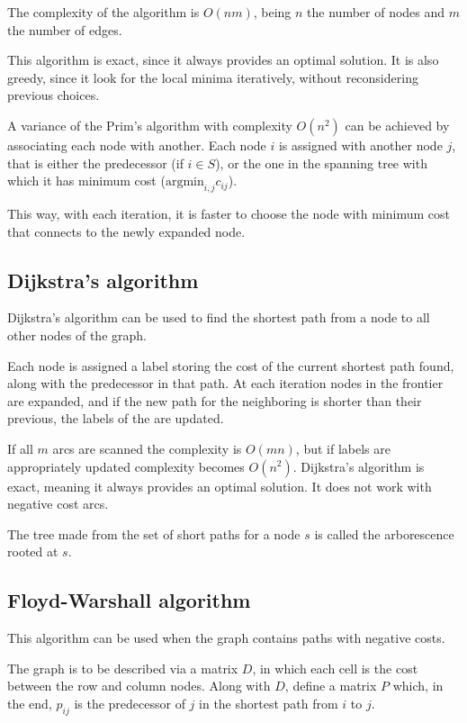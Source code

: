 The complexity of the algorithm is $O(nm)$, being $n$ the number of nodes and $m$ the number of edges.

This algorithm is exact, since it always provides an optimal solution.
It is also greedy, since it look for the local minima iteratively, without reconsidering previous choices.

\newpar
A variance of the Prim's algorithm with complexity $O(n^2)$ can be achieved by associating each node with another.
Each node $i$ is assigned with another node $j$, that is either the predecessor (if $i \in S$), or the one in the spanning tree with which it has minimum cost ($\mathrm{argmin}_{i,j} c_{ij}$).

This way, with each iteration, it is faster to choose the node with minimum cost that connects to the newly expanded node.

\subsection{Dijkstra's algorithm}

Dijkstra's algorithm can be used to find the shortest path from a node to all other nodes of the graph.

Each node is assigned a label storing the cost of the current shortest path found, along with the predecessor in that path.
At each iteration nodes in the frontier are expanded, and if the new path for the neighboring is shorter than their previous, the labels of the are updated.

If all $m$ arcs are scanned the complexity is $O(mn)$, but if labels are appropriately updated complexity becomes $O(n^2)$.
Dijkstra's algorithm is exact, meaning it always provides an optimal solution.
It does not work with negative cost arcs.

The tree made from the set of short paths for a node $s$ is called the arborescence rooted at $s$.

\subsection{Floyd-Warshall algorithm}

This algorithm can be used when the graph contains paths with negative costs.

The graph is to be described via a matrix $D$, in which each cell is the cost between the row and column nodes.
Along with $D$, define a matrix $P$ which, in the end, $p_{ij}$ is the predecessor of $j$ in the shortest path from $i$ to $j$.

